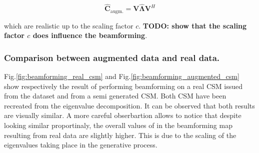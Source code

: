 \documentclass{article}
\begin{document}
\begin{equation}
    \mathbf{\hat{C}}_\text{augm.}  = \mathbf{V} \hat{\mathbf{\Lambda}} \mathbf{V}^H
\end{equation}

which are realistic up to the scaling factor $c$. \textbf{TODO: show that the scaling factor $c$ does influence the beamforming}.

\subsubsection{Comparison between augmented data and real data.}


Fig.\ref{fig:beamforming_real_csm} and Fig.\ref{fig:beamforming_augmented_csm} show respectively the result of performing beamforming on a real CSM issued from the dataset and from a semi generated CSM. Both CSM have been recreated from the eigenvalue decomposition. It can be observed that both results are visually similar. A more careful obserbartion allows to notice that despite looking similar proportinaly, the overall values of in the beamforming map resulting from real data are slightly higher. This is due to the scaling of the eigenvalues taking place in the generative process. 
\end{document}

